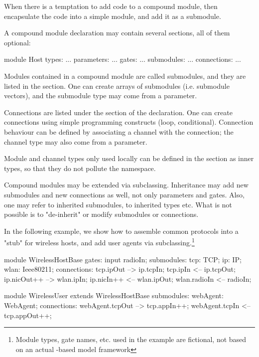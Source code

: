 \begin{note}
    When there is a temptation to add code to a compound module,
    then encapsulate the code into a simple module, and add it as
    a submodule.
\end{note}

A compound module declaration may contain several sections,
all of them optional:

\begin{ned}
module Host
{
   types:
       ...
   parameters:
       ...
   gates:
       ...
   submodules:
       ...
   connections:
       ...
}
\end{ned}

Modules contained in a compound module are called submodules, and they are
listed in the  section. One can create arrays of submodules
(i.e. submodule vectors), and the submodule type may come from a parameter.

Connections are listed under the  section of the
declaration. One can create connections using simple programming constructs
(loop, conditional). Connection behaviour can be defined by associating a
channel with the connection; the channel type may also come from a
parameter.

Module and channel types only used locally can be defined in the
 section as inner types, so that they do not pollute the
namespace.

Compound modules may be extended via subclassing. Inheritance may add new
submodules and new connections as well, not only parameters and gates.
Also, one may refer to inherited submodules, to inherited types etc. What
is not possible is to "de-inherit" or modify submodules or connections.

In the following example, we show how to assemble common protocols
into a "stub" for wireless hosts, and add user agents via
subclassing.\footnote{Module types, gate names, etc. used in the example
are fictional, not based on an actual {\opp}-based model framework}

\begin{ned}
module WirelessHostBase
{
   gates:
       input radioIn;
   submodules:
       tcp: TCP;
       ip: IP;
       wlan: Ieee80211;
   connections:
       tcp.ipOut --> ip.tcpIn;
       tcp.ipIn <-- ip.tcpOut;
       ip.nicOut++ --> wlan.ipIn;
       ip.nicIn++ <-- wlan.ipOut;
       wlan.radioIn <-- radioIn;
}

module WirelessUser extends WirelessHostBase
{
   submodules:
       webAgent: WebAgent;
   connections:
       webAgent.tcpOut --> tcp.appIn++;
       webAgent.tcpIn <-- tcp.appOut++;
}
\end{ned}

